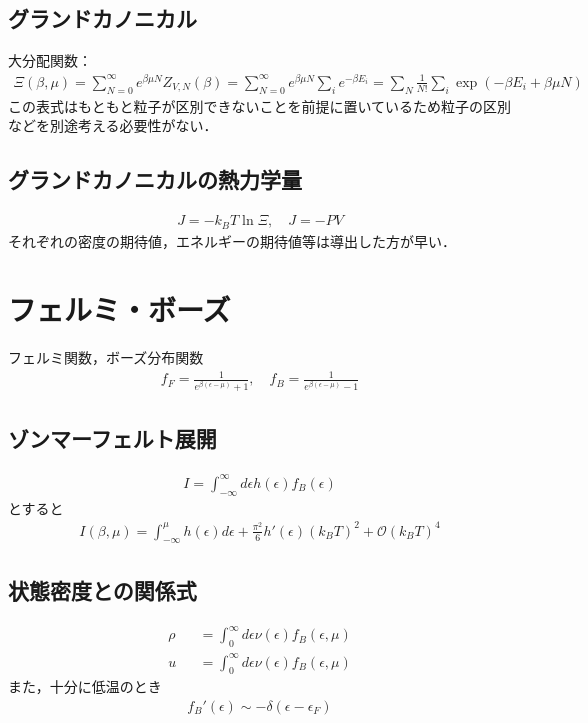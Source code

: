 \documentclass[12pt,dvipdfmx]{jsarticle}
\begin{document}
\subsection*{グランドカノニカル}
大分配関数：
\begin{eqnarray}
  \Xi(\beta,\mu) = \sum_{N=0}^{\infty} e^{\beta\mu N}Z_{V,N}(\beta) = \sum_{N=0}^{\infty}e^{\beta \mu N} \sum_{i} e^{-\beta E_i} = \sum_N \frac{1}{N!}\sum_i\exp\left( -\beta E_i + \beta\mu N \right)
\end{eqnarray}
この表式はもともと粒子が区別できないことを前提に置いているため粒子の区別などを別途考える必要性がない．
\subsection*{グランドカノニカルの熱力学量}
\begin{eqnarray}
  J = -k_B T \ln \Xi,\quad J = -PV
\end{eqnarray}
それぞれの密度の期待値，エネルギーの期待値等は導出した方が早い．
\section*{\Large{フェルミ・ボーズ}}
フェルミ関数，ボーズ分布関数
\begin{eqnarray}
  f_F = \frac{1}{e^{\beta(\epsilon-\mu)}+1},\quad f_B = \frac{1}{e^{\beta(\epsilon-\mu)}-1}
\end{eqnarray}
\subsection*{ゾンマーフェルト展開}
\begin{eqnarray}
  I = \int_{-\infty}^{\infty} d\epsilon h(\epsilon) f_B(\epsilon)
\end{eqnarray}
とすると
\begin{eqnarray}
  I(\beta,\mu) = \int_{-\infty}^{\mu} h(\epsilon)d\epsilon + \frac{\pi^2}{6}h'(\epsilon)(k_BT)^2 + \mathcal{O}(k_BT)^4
\end{eqnarray}
\subsection*{状態密度との関係式}
\begin{eqnarray}
  \rho &&= \int_0^{\infty} d\epsilon \nu(\epsilon) f_B(\epsilon,\mu)\\
  u &&= \int_0^{\infty} d\epsilon \nu(\epsilon) f_{B}(\epsilon,\mu)
\end{eqnarray}
また，十分に低温のとき
\begin{eqnarray}
  f_B'(\epsilon) \sim -\delta(\epsilon-\epsilon_F)
\end{eqnarray}
\end{document}
